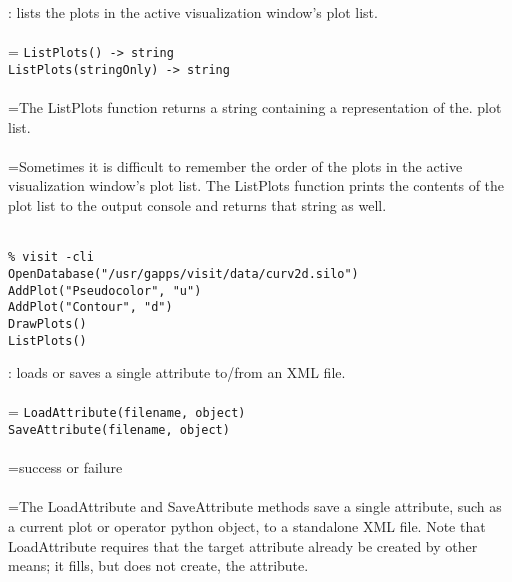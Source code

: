 \documentclass[10pt,a4paper]{report}
\begin{document}
{}
: lists the plots in the active visualization window's plot list.\\[-3mm]

 \\ 
\hangindent=\parindent 
\verb!ListPlots() -> string!\\ 
\verb!ListPlots(stringOnly) -> string!\\ [-3mm]

 \\ 
\hangindent=\parindent The ListPlots function returns a string containing a representation of the. plot list. \\[-3mm] 

 \\ 
\hangindent=\parindent Sometimes it is difficult to remember the order of the plots in the active visualization window's plot list. The ListPlots function prints the contents of the plot list to the output console and returns that string as well. \\[-3mm] 

\\[-6mm]
\begin{verbatim}% visit -cli
OpenDatabase("/usr/gapps/visit/data/curv2d.silo")
AddPlot("Pseudocolor", "u")
AddPlot("Contour", "d")
DrawPlots()
ListPlots()
\end{verbatim}
\newpage


{}
: loads or saves a single attribute to/from an XML file.\\[-3mm]

 \\ 
\hangindent=\parindent 
\verb!LoadAttribute(filename, object)!\\ 
\verb!SaveAttribute(filename, object)!\\ [-3mm]

 \\ 
\hangindent=\parindent success or failure \\[-3mm] 

 \\ 
\hangindent=\parindent The LoadAttribute and SaveAttribute methods save a single attribute, such as a current plot or operator python object, to a standalone XML file.  Note that LoadAttribute requires that the target attribute already be created by other means; it fills, but does not create, the attribute. \\[-3mm] 
\end{document}
